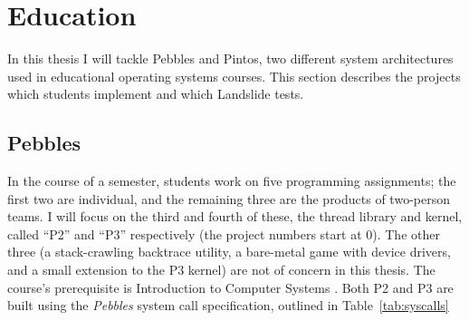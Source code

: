 
\section{Education}
\label{sec:overview-edu}

In this thesis I will tackle Pebbles and Pintos, two different system architectures used in educational operating systems courses.
This section describes the projects which students implement and which Landslide tests.

\subsection{Pebbles}
\label{sec:pebbles}

In the course of a semester, students work on five programming assignments;
the first two are individual, and the remaining three are the products of two-person teams.
I will focus on the third and fourth of these, the thread library and kernel,
called ``P2'' and ``P3'' respectively (the project numbers start at 0).
The other three (a stack-crawling backtrace utility, a bare-metal game with device drivers, and a small extension to the P3 kernel) are not of concern in this thesis.
The course's prerequisite is Introduction to Computer Systems \cite{sigcse01:CSaPP}.
Both P2 and P3 are built using the {\em Pebbles} system call specification, outlined in Table~\ref{tab:syscalls}

